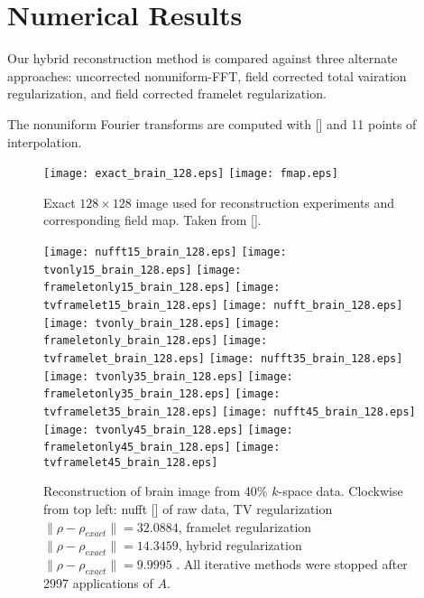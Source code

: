 \documentclass[11pt]{amsart}
\theoremstyle{remark}
\begin{document}
\section{Numerical Results}

Our hybrid reconstruction method is compared against three alternate approaches: uncorrected nonuniform-FFT, field corrected total vairation regularization, and field corrected framelet regularization.

The nonuniform Fourier transforms are computed with [] and 11 points of interpolation. 

\begin{center}
\begin{figure}[h!]
\texttt{[image: exact\_brain\_128.eps]}
\texttt{[image: fmap.eps]}
\caption{Exact $128 \times 128$ image used for reconstruction experiments and corresponding field map. Taken from [].}
\end{figure}
\end{center}

\begin{center}
\begin{figure}[h!]
\texttt{[image: nufft15\_brain\_128.eps]}
\texttt{[image: tvonly15\_brain\_128.eps]}
\texttt{[image: frameletonly15\_brain\_128.eps]}
\texttt{[image: tvframelet15\_brain\_128.eps]}
\linebreak
\texttt{[image: nufft\_brain\_128.eps]}
\texttt{[image: tvonly\_brain\_128.eps]}
\texttt{[image: frameletonly\_brain\_128.eps]}
\texttt{[image: tvframelet\_brain\_128.eps]}
\linebreak
\texttt{[image: nufft35\_brain\_128.eps]}
\texttt{[image: tvonly35\_brain\_128.eps]}
\texttt{[image: frameletonly35\_brain\_128.eps]}
\texttt{[image: tvframelet35\_brain\_128.eps]}
\linebreak
\texttt{[image: nufft45\_brain\_128.eps]}
\texttt{[image: tvonly45\_brain\_128.eps]}
\texttt{[image: frameletonly45\_brain\_128.eps]}
\texttt{[image: tvframelet45\_brain\_128.eps]}
\caption{Reconstruction of brain image from 40\% $k$-space data. Clockwise from top left: nufft [] of raw data, TV regularization $\| \rho - \rho_{exact} \| = 32.0884$, framelet regularization $\| \rho - \rho_{exact} \| = 14.3459$, hybrid regularization $\| \rho - \rho_{exact} \| = 9.9995$ . All iterative methods were stopped after 2997 applications of $A$.}
\end{figure}
\end{center}
\end{document}
